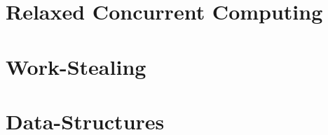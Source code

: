 \section{\label{section:relaxed-concurrent}Relaxed Concurrent Computing}
\section{\label{section:work-stealing}Work-Stealing}
\section{\label{section:data-structures}Data-Structures}


